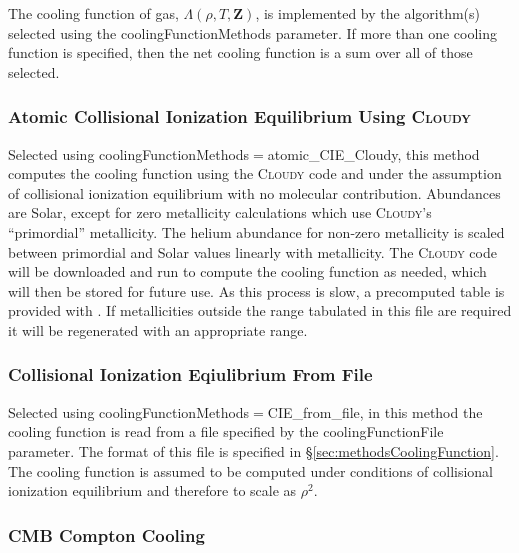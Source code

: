 The cooling function of gas, $\Lambda(\rho,T,{\mathbf Z})$, is implemented by the algorithm(s) selected using the {\normalfont \ttfamily coolingFunctionMethods} parameter. If more than one cooling function is specified, then the net cooling function is a sum over all of those selected.

\subsubsection{Atomic Collisional Ionization Equilibrium Using {\normalfont \scshape Cloudy}}

Selected using {\normalfont \ttfamily coolingFunctionMethods}$=${\normalfont \ttfamily atomic\_CIE\_Cloudy}, this method computes the cooling function using the {\normalfont \scshape Cloudy} code and under the assumption of collisional ionization equilibrium with no molecular contribution. Abundances are Solar, except for zero metallicity calculations which use {\normalfont \scshape Cloudy}'s ``primordial'' metallicity. The helium abundance for non-zero metallicity is scaled between primordial and Solar values linearly with metallicity. The {\normalfont \scshape Cloudy} code will be downloaded and run to compute the cooling function as needed, which will then be stored for future use. As this process is slow, a precomputed table is provided with \glc. If metallicities outside the range tabulated in this file are required it will be regenerated with an appropriate range.

\subsubsection{Collisional Ionization Eqiulibrium From File}

Selected using {\normalfont \ttfamily coolingFunctionMethods}$=${\normalfont \ttfamily CIE\_from\_file}, in this method the cooling function is read from a file specified by the {\normalfont \ttfamily coolingFunctionFile} parameter. The format of this file is specified in \S\ref{sec:methodsCoolingFunction}. The cooling function is assumed to be computed under conditions of collisional ionization equilibrium and therefore to scale as $\rho^2$.

\subsubsection{CMB Compton Cooling}

